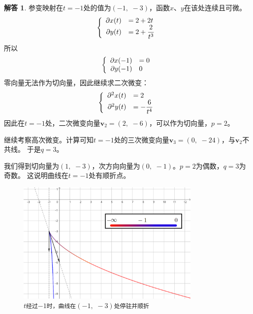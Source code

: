 \documentclass[12pt,UTF8]{ctexbook}
\theoremstyle{definition}
\newtheorem*{so}{解答}
\theoremstyle{plain}
\begin{document}
\begin{so}
    参变映射在$t=-1$处的值为$(-1, \,\,-3)$，函数$x$、$y$在该处连续且可微。
    $$
    \left\{
        \begin{array}[]{rl}
            \partial x(t) &=2 + 2t \\
            \partial y(t) &\displaystyle = 2 + \frac{2}{t^3}\\
        \end{array}
    \right.
    $$
    所以
    $$
    \left\{
        \begin{array}[]{rl}
            \partial x(-1) &= 0 \\
            \partial y(-1) & 0\\
        \end{array}
    \right.
    $$
    零向量无法作为切向量，因此继续求二次微变：
    $$
    \left\{
        \begin{array}[]{rl}
            \partial^2 x(t) &=2 \\
            \partial^2 y(t) &\displaystyle = - \frac{6}{t^4}\\
        \end{array}
    \right.
    $$
    因此在$t=-1$处，二次微变向量$\mathbf{v}_2 = (2, \,\,-6)$，可以作为切向量，$p=2$。

    继续考察高次微变。计算可知$t=-1$处的三次微变向量$\mathbf{v}_3 = (0, \,\,-24)$，与$\mathbf{v}_2$不共线。
    于是$q=3$。
    
    我们得到切向量为$(1,\,\,-3)$，次方向向量为$(0,\,\,-1)$。$p=2$为偶数，$q=3$为奇数。
    这说明曲线在$t=-1$处有顺折点。
\end{so}

\begin{figure}[h] 
    \centering
    \includegraphics[width=0.8\textwidth]{tu/曲线局部渐近行为01.png}
    \caption*{\texttt{$t$经过$-1$时，曲线在$(-1, \,\,-3)$处停驻并顺折}}
\end{figure}
\end{document}
